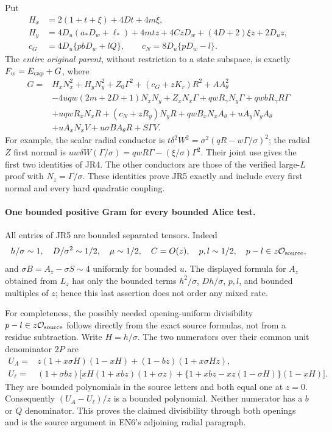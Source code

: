 Put
\begin{align*}
 H_x&=2(1+t+\xi)+4Dt+4m\xi,\\
 H_y&=4D_u(a_*D_w+\ell_*)+4mtz+4CzD_w+(4D+2)\xi z+2D_uz,\\
 c_G&=4D_u\{pbD_w+lQ\},\qquad
 c_N=8D_u\{pD_w-l\}.
\end{align*}
The \emph{entire original parent}, without restriction to a state
subspace, is exactly $F_w=E_{\rm cap}+G$, where
\begin{align*}
 G={}&H_xN_x^2+H_yN_y^2+Z_0\Gamma^2
        +(c_G+zK_r)R^2+AA_\theta^2\\
 &-4uqw(2m+2D+1)N_xN_y+Z_xN_x\Gamma
       +qwR_\gamma N_y\Gamma+qwbR_\gamma R\Gamma\\
 &+uqwR_xN_xR+(c_N+zR_y)N_yR
       +qwB_xN_xA_\theta+uA_yN_yA_\theta\\
 &+uA_xN_xV+u\sigma B A_\theta R+S\Gamma V.
\tag{JR5}
\end{align*}
For example, the scalar radial conductor is
$t\delta^2W^2=\sigma^2(qR-w\Gamma/\sigma)^2$;
the radial $Z$ first normal is
$uw\delta W(\Gamma/\sigma)=qwR\Gamma-(\xi/\sigma)\Gamma^2$.
Their joint use gives the first two identities of JR4. The other
conductors are those of the verified large-$L$ proof with
$N_z=\Gamma/\sigma$. These identities prove JR5 exactly and include
every first normal and every hard quadratic coupling.

\paragraph{One bounded positive Gram for every bounded Alice test.}
All entries of JR5 are bounded separated tensors. Indeed
\[
 h/\sigma\sim1,\quad D/\sigma^2\sim1/2,\quad
 \mu\sim1/2,\quad C=O(z),\quad p,l\sim1/2,
 \quad p-l\in z\mathcal O_{\rm source},
\]
and $\sigma B=A_z-\sigma S\sim4$ uniformly for bounded $u$.
The displayed formula for $A_z$ obtained from $L_z$ has only the
bounded terms $h^2/\sigma$, $Dh/\sigma$, $p,l$, and bounded multiples
of $z$; hence this last assertion does not order any mixed rate.

For completeness, the possibly needed opening-uniform divisibility
$p-l\in z\mathcal O_{\rm source}$ follows directly from the exact
source formulas, not from a residue subtraction. Write $H=h/\sigma$.
The two numerators over their common unit denominator $2P$ are
\begin{align*}
 U_A={}&z(1+x\sigma H)(1-xH)+(1-bz)(1+x\sigma Hz),\\
 U_\ell={}&(1+\sigma bz)\big[xH(1+xbz)(1+\sigma z)
       +\{1+xbz-xz(1-\sigma H)\}(1-xH)\big].
\end{align*}
They are bounded polynomials in the source letters and both equal
one at $z=0$. Consequently $(U_A-U_\ell)/z$ is a bounded polynomial.
Neither numerator has a $b$ or $Q$ denominator. This proves the claimed
divisibility through both openings and is the source argument in EN6's
adjoining radial paragraph.

